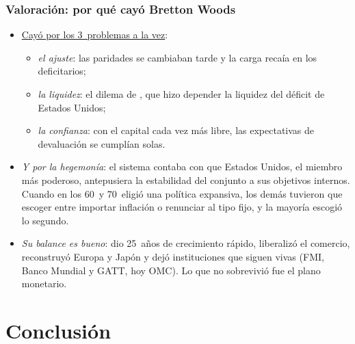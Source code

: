 \documentclass[11pt]{article}
\begin{document}
\subsubsection{Valoración: por qué cayó Bretton Woods}

\begin{itemize}
\item \uline{Cayó por los 3~problemas a la vez}:
  \begin{itemize}
  \item \emph{el ajuste}: las paridades se cambiaban tarde y la carga recaía en los deficitarios;
  \item \emph{la liquidez}: el dilema de , que hizo depender la liquidez del déficit de Estados Unidos;
  \item \emph{la confianza}: con el capital cada vez más libre, las expectativas de devaluación se cumplían solas.
  \end{itemize}
\item \emph{Y por la hegemonía}: el sistema contaba con que Estados Unidos, el miembro más poderoso, antepusiera la estabilidad del conjunto a sus objetivos internos. Cuando en los 60~y 70~eligió una política expansiva, los demás tuvieron que escoger entre importar inflación o renunciar al tipo fijo, y la mayoría escogió lo segundo.
\item \emph{Su balance es bueno}: dio 25~años de crecimiento rápido, liberalizó el comercio, reconstruyó Europa y Japón y dejó instituciones que siguen vivas (FMI, Banco Mundial y GATT, hoy OMC). Lo que no sobrevivió fue el plano monetario.
\end{itemize}

\section*{Conclusión}
\end{document}

